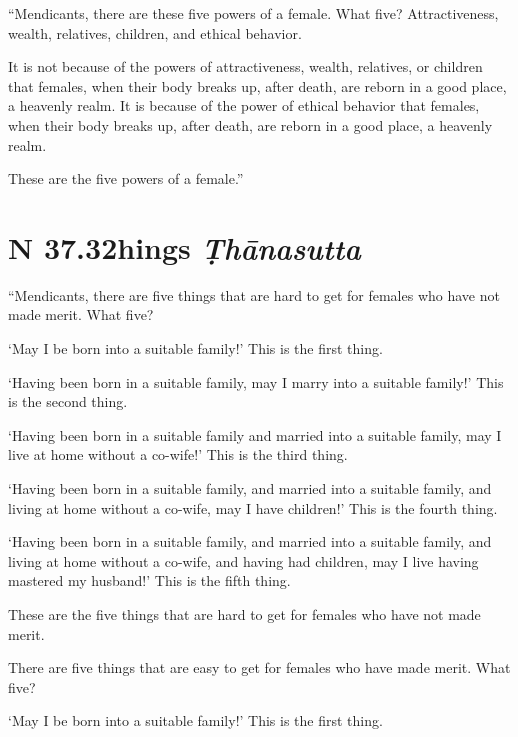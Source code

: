 \documentclass[12pt,openany]{book}%
\newcommand*{\suttatitleacronym}[1]{\smaller[2]{#1}\vspace*{.3em}}
\newcommand*{\suttatitletranslation}[1]{\linebreak{#1}}
\newcommand*{\suttatitleroot}[1]{\linebreak\smaller[2]\itshape{#1}}
\newcommand*{\tocacronym}[1]{\hspace*{-3.3em}{#1}\quad}
\newcommand*{\toctranslation}[1]{#1}
\newcommand*{\tocroot}[1]{(\textit{#1})}
\begin{document}
“Mendicants, there are these five powers of a female. What five? Attractiveness, wealth, relatives, children, and ethical behavior. 

It is not because of the powers of attractiveness, wealth, relatives, or children that females, when their body breaks up, after death, are reborn in a good place, a heavenly realm. It is because of the power of ethical behavior that females, when their body breaks up, after death, are reborn in a good place, a heavenly realm. 

These are the five powers of a female.” 

%
\section*{{\suttatitleacronym SN 37.32}{\suttatitletranslation Things }{\suttatitleroot Ṭhānasutta}}
\addcontentsline{toc}{section}{\tocacronym{SN 37.32} \toctranslation{Things } \tocroot{Ṭhānasutta}}

“Mendicants, there are five things that are hard to get for females who have not made merit. What five? 

‘May I be born into a suitable family!’ This is the first thing. 

‘Having been born in a suitable family, may I marry into a suitable family!’ This is the second thing. 

‘Having been born in a suitable family and married into a suitable family, may I live at home without a co-wife!’ This is the third thing. 

‘Having been born in a suitable family, and married into a suitable family, and living at home without a co-wife, may I have children!’ This is the fourth thing. 

‘Having been born in a suitable family, and married into a suitable family, and living at home without a co-wife, and having had children, may I live having mastered my husband!’ This is the fifth thing. 

These are the five things that are hard to get for females who have not made merit. 

There are five things that are easy to get for females who have made merit. What five? 

‘May I be born into a suitable family!’ This is the first thing. 
\end{document}
